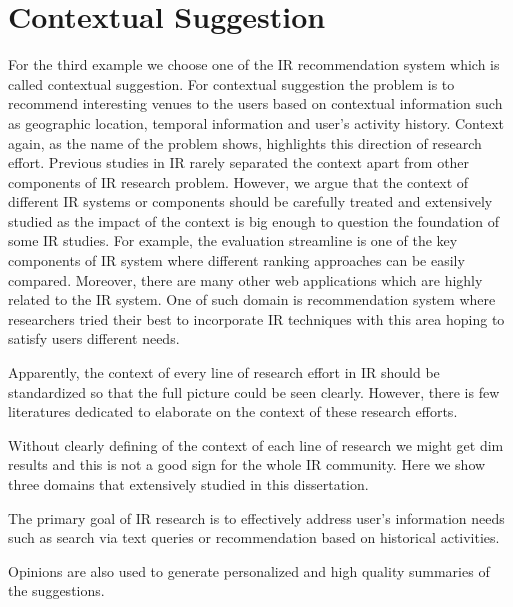 \section{Contextual Suggestion}
For the third example we choose one of the IR recommendation system which is 
called contextual suggestion. For contextual suggestion the problem is to 
recommend interesting venues to the users based on contextual information 
such as geographic location, temporal information and user's activity history. 
Context again, as the name of the problem shows, highlights this direction 
of research effort. 
Previous studies in IR rarely separated the context apart from other 
components of IR research problem. However, we argue that the context of 
different IR systems or components should be carefully treated and extensively 
studied as the impact of the context is big enough to question the foundation 
of some IR studies.
For example, the evaluation streamline is one of the key 
components of IR system where different ranking approaches can be 
easily compared. Moreover, there are many other web applications which 
are highly related to the IR system. One of such domain is recommendation 
system where researchers tried their best to incorporate IR techniques 
with this area hoping to satisfy users different needs.

Apparently, the context of 
every line of research effort in IR should be standardized so that the 
full picture could be seen clearly. 
However, there is few literatures dedicated to elaborate on the context 
of these research efforts.



Without clearly defining of the context of each line of research we might get  
dim results and this is not a good sign for the whole IR community. 
Here we show three domains that extensively studied in this dissertation. 




The primary goal of IR research is to effectively address user's 
information needs such as search via text queries or recommendation 
based on historical activities. 

Opinions are also used to generate personalized and high 
quality summaries of the suggestions. 